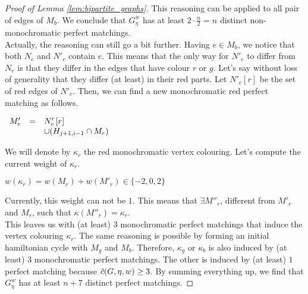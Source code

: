 \begin{proof}[Proof of Lemma \ref{lem:bipartite_graphs}]
    This reasoning can be applied to all pair of edges of $M_b$.
    We conclude that $G_\eta^w$ has at least $2 \cdot \frac{n}{2} = n$ distinct non-monochromatic perfect matchings.\\

    Actually, the reasoning can still go a bit further.
    Having $e \in M_b$, we notice that both $N_e$ and $N'_e$ contain $e$.
    This means that the only way for $N'_e$ to differ from $N_e$ is that they differ in the edges that have colour $r$ or $g$.
    Let's say without loss of generality that they differ (at least) in their red parts.
    Let $N'_{e}\left[r\right]$ be the set of red edges of $N'_e$.
    Then, we can find a new monochromatic red perfect matching as follows.

    \begin{center}
        $\begin{array}{r c l}
            M'_r & = & N'_{e}\left[r\right] \\
                 &   & \cup (H_{j+1, i-1} \cap M_r)
        \end{array}$
    \end{center}

    We will denote by $\kappa_r$ the red monochromatic vertex colouring.
    Let's compute the current weight of $\kappa_r$.
    \begin{center}
        $w(\kappa_r) = w(M_r) + w(M'_r) \in \{-2, 0, 2\}$
    \end{center}
    Currently, this weight can not be $1$.
    This means that $\exists M''_r$, different from $M'_r$ and $M_r$, such that $\kappa(M''_r) = \kappa_r$.\\

    This leaves us with (at least) $3$ monochromatic perfect matchings that induce the vertex colouring $\kappa_r$.
    The same reasoning is possible by forming an initial hamiltonian cycle with $M_g$ and $M_b$.
    Therefore, $\kappa_g$ or $\kappa_b$ is also induced by (at least) $3$ monochromatic perfect matchings.
    The other is induced by (at least) $1$ perfect matching because $\Tilde{c}(G, \eta, w) \geq 3$.
    By summing everything up, we find that $G_\eta^w$ has at least $n + 7$ distinct perfect matchings.

\end{proof}
